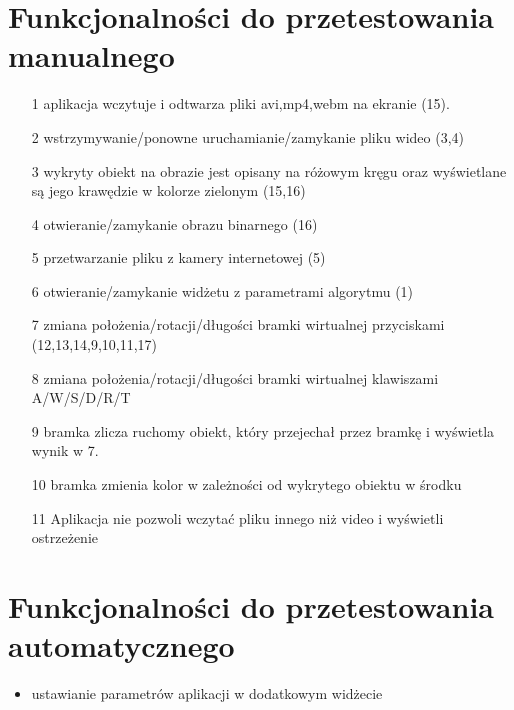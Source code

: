 \documentclass[11pt,a4paper]{article}
\begin{document}
\section{Funkcjonalności do przetestowania manualnego}
\begin{enumerate}
\item[1] aplikacja wczytuje i odtwarza pliki avi,mp4,webm na ekranie (15). 
\item[2] wstrzymywanie/ponowne uruchamianie/zamykanie pliku wideo (3,4)
\item[3] wykryty  obiekt na obrazie jest opisany na  różowym kręgu oraz wyświetlane są jego krawędzie w kolorze zielonym (15,16)
\item[4] otwieranie/zamykanie obrazu binarnego (16)
\item[5] przetwarzanie pliku z kamery internetowej (5)
\item[6] otwieranie/zamykanie widżetu z parametrami algorytmu (1)
\item[7] zmiana położenia/rotacji/długości bramki wirtualnej przyciskami (12,13,14,9,10,11,17)
\item[8] zmiana położenia/rotacji/długości bramki wirtualnej klawiszami A/W/S/D/R/T
\item[9] bramka zlicza ruchomy obiekt, który przejechał przez bramkę i wyświetla wynik w 7.
\item[10] bramka zmienia kolor w zależności od wykrytego obiektu w środku
\item[11] Aplikacja nie pozwoli wczytać pliku innego niż video i wyświetli ostrzeżenie
\end{enumerate}

\section{Funkcjonalności do przetestowania automatycznego}
\begin{itemize}
\item ustawianie parametrów aplikacji w dodatkowym widżecie
\end{itemize}
\end{document}
